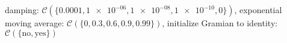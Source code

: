 damping: $\mathcal{C}(\{\num[scientific-notation=true]{0.0001},\num[scientific-notation=true]{1e-06},\num[scientific-notation=true]{1e-08},\num[scientific-notation=true]{1e-10},\num[scientific-notation=false]{0}\})$, exponential moving average: $\mathcal{C}(\{\num[scientific-notation=false]{0},\num[scientific-notation=true]{0.3},\num[scientific-notation=true]{0.6},\num[scientific-notation=true]{0.9},\num[scientific-notation=true]{0.99}\})$, initialize Gramian to identity: $\mathcal{C}(\{\text{no},\text{yes}\})$